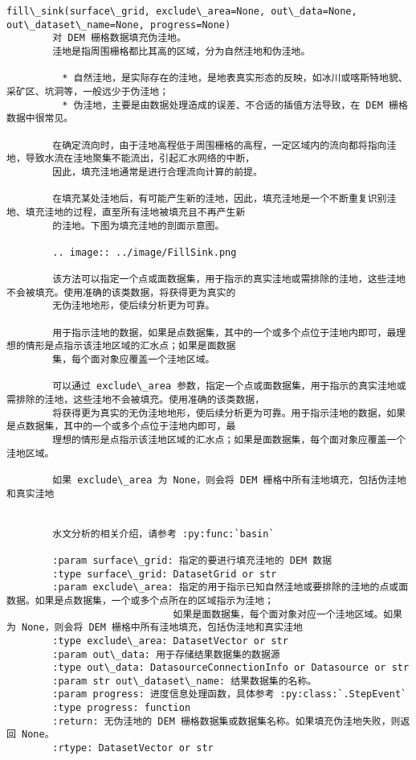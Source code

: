\documentclass[11pt]{article}
\begin{document}
\begin{Verbatim}[commandchars=\\\{\}]
    fill\_sink(surface\_grid, exclude\_area=None, out\_data=None, out\_dataset\_name=None, progress=None)
        对 DEM 栅格数据填充伪洼地。
        洼地是指周围栅格都比其高的区域，分为自然洼地和伪洼地。
        
        　* 自然洼地，是实际存在的洼地，是地表真实形态的反映，如冰川或喀斯特地貌、采矿区、坑洞等，一般远少于伪洼地；
        　* 伪洼地，主要是由数据处理造成的误差、不合适的插值方法导致，在 DEM 栅格数据中很常见。
        
        在确定流向时，由于洼地高程低于周围栅格的高程，一定区域内的流向都将指向洼地，导致水流在洼地聚集不能流出，引起汇水网络的中断，
        因此，填充洼地通常是进行合理流向计算的前提。
        
        在填充某处洼地后，有可能产生新的洼地，因此，填充洼地是一个不断重复识别洼地、填充洼地的过程，直至所有洼地被填充且不再产生新
        的洼地。下图为填充洼地的剖面示意图。
        
        .. image:: ../image/FillSink.png
        
        该方法可以指定一个点或面数据集，用于指示的真实洼地或需排除的洼地，这些洼地不会被填充。使用准确的该类数据，将获得更为真实的
        无伪洼地地形，使后续分析更为可靠。
        
        用于指示洼地的数据，如果是点数据集，其中的一个或多个点位于洼地内即可，最理想的情形是点指示该洼地区域的汇水点；如果是面数据
        集，每个面对象应覆盖一个洼地区域。
        
        可以通过 exclude\_area 参数，指定一个点或面数据集，用于指示的真实洼地或需排除的洼地，这些洼地不会被填充。使用准确的该类数据，
        将获得更为真实的无伪洼地地形，使后续分析更为可靠。用于指示洼地的数据，如果是点数据集，其中的一个或多个点位于洼地内即可，最
        理想的情形是点指示该洼地区域的汇水点；如果是面数据集，每个面对象应覆盖一个洼地区域。
        
        如果 exclude\_area 为 None，则会将 DEM 栅格中所有洼地填充，包括伪洼地和真实洼地
        
        
        水文分析的相关介绍，请参考 :py:func:`basin`
        
        :param surface\_grid: 指定的要进行填充洼地的 DEM 数据
        :type surface\_grid: DatasetGrid or str
        :param exclude\_area: 指定的用于指示已知自然洼地或要排除的洼地的点或面数据。如果是点数据集，一个或多个点所在的区域指示为洼地；
                             如果是面数据集，每个面对象对应一个洼地区域。如果为 None，则会将 DEM 栅格中所有洼地填充，包括伪洼地和真实洼地
        :type exclude\_area: DatasetVector or str
        :param out\_data: 用于存储结果数据集的数据源
        :type out\_data: DatasourceConnectionInfo or Datasource or str
        :param str out\_dataset\_name: 结果数据集的名称。
        :param progress: 进度信息处理函数，具体参考 :py:class:`.StepEvent`
        :type progress: function
        :return: 无伪洼地的 DEM 栅格数据集或数据集名称。如果填充伪洼地失败，则返回 None。
        :rtype: DatasetVector or str
    

\end{Verbatim}
\end{document}
